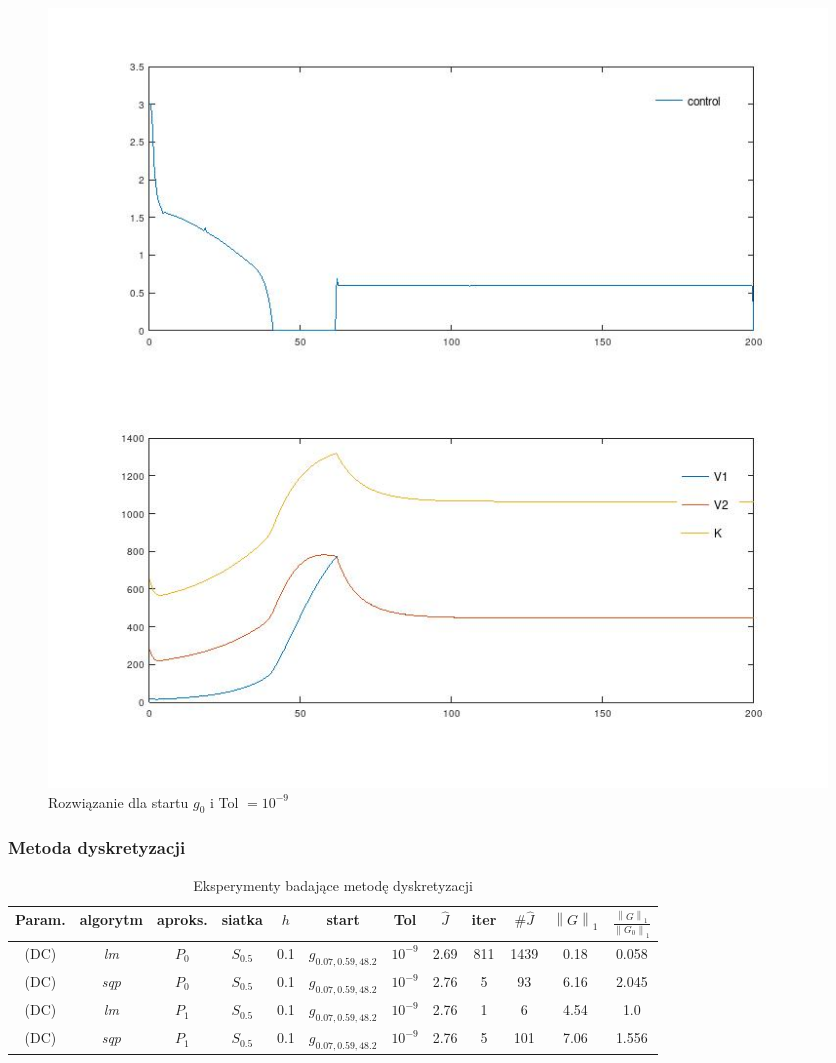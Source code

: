 \documentclass[11pt]{article}
\newcommand{\norm}[1]{\left\lVert#1\right\rVert}
\begin{document}
\begin{figure}[h]
  \centering
  \includegraphics[width=.5\textwidth]{../plots/plot_zprc}
  \caption{Rozwiązanie dla startu $g_0$ i Tol $= 10^{-9}$}\label{test_zero_9}
\end{figure}

\subsubsection{Metoda dyskretyzacji}

\begin{table}[h!]
  \begin{center}
    \begin{tabular}{|c|c|c|c|c|c|c||c|c|c|c|c|}
      \hline
      Param. & algorytm & aproks. & siatka & $h$ & start & Tol & $\hat{J}$ & iter & $\#\hat{J}$ & $\norm{G}_1$ & $\frac{\norm{G}_1}{\norm{G_0}_1}$ \\
      \hline
      (DC) & {\it lm\/} & $P_0$ & $S_{0.5}$ & 0.1 & $g_{0.07,0.59,48.2}$ & $10^{-9}$ & 2.69 & 811 & 1439 & 0.18 & 0.058 \\
      \hline
      (DC) & {\it sqp\/} & $P_0$ & $S_{0.5}$ & 0.1 & $g_{0.07,0.59,48.2}$ & $10^{-9}$ & 2.76 & 5 & 93 & 6.16 & 2.045 \\
      \hline
      (DC) & {\it lm\/} & $P_1$ & $S_{0.5}$ & 0.1 & $g_{0.07,0.59,48.2}$ & $10^{-9}$ & 2.76 & 1 & 6 & 4.54 & 1.0 \\
      \hline
      (DC) & {\it sqp\/} & $P_1$ & $S_{0.5}$ & 0.1 & $g_{0.07,0.59,48.2}$ & $10^{-9}$ & 2.76 & 5 & 101 & 7.06 & 1.556 \\
      \hline
    \end{tabular}
    \caption{Eksperymenty badające metodę dyskretyzacji}\label{discr_tbl}
  \end{center}
\end{table}
\end{document}
